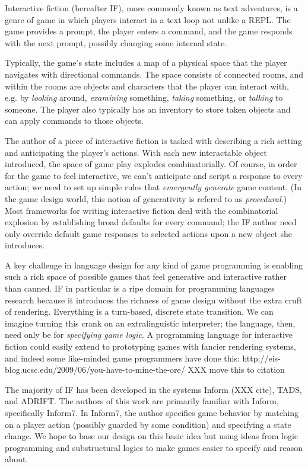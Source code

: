 Interactive fiction (hereafter IF), more commonly known as text adventures,
is a genre of game in which players interact in a text loop not unlike a
REPL. The game provides a prompt, the player enters a command, and the game
responds with the next prompt, possibly changing some internal state.

Typically, the game's state includes a map of a physical space that the
player navigates with directional commands. The space consists of connected
rooms, and within the rooms are objects and characters that the player can
interact with, e.g. by {\em looking} around, {\em examining} something, 
{\em taking} something, or {\em talking} to someone. The player also
typically has an inventory to store taken objects and can apply commands to
those objects.

The author of a piece of interactive fiction is tasked with describing a
rich setting and anticipating the player's actions.  With each new
interactable object introduced, the space of game play explodes
combinatorially. Of course, in order for the game to feel interactive, we
can't anticipate and script a response to every action; we need to set up
simple rules that {\em emergently generate} game content.  (In the game
design world, this notion of generativity is refered to as {\em
procedural}.) Most frameworks for writing interactive fiction deal with the
combinatorial explosion by establishing broad defaults for every command;
the IF author need only override default game responses to selected actions
upon a new object she introduces.

A key challenge in language design for any kind of game programming is
enabling such a rich space of possible games that feel generative and
interactive rather than canned.  IF in particular is a ripe domain for
programming languages research because it introduces the richness of game
design without the extra cruft of rendering. Everything is a turn-based,
discrete state transition. We can imagine turning this crank on an
extralinguistic interpreter; the language, then, need only be for {\em
specifying game logic}. A programming language for interactive fiction could
easily extend to prototyping games with fancier rendering systems, and
indeed some like-minded game programmers have done this:
http://eis-blog.ucsc.edu/2009/06/you-have-to-mine-the-ore/ XXX move this to
citation

The majority of IF has been developed in the systems Inform (XXX cite), TADS,
and ADRIFT. The authors of this work are primarily familiar with Inform,
specifically Inform7. In Inform7, the author specifies game behavior by
matching on a player action (possibly guarded by some condition) and
specifying a state change. We hope to base our design on this basic idea
but using ideas from logic programming and substructural logics to make
games easier to specify and reason about.

